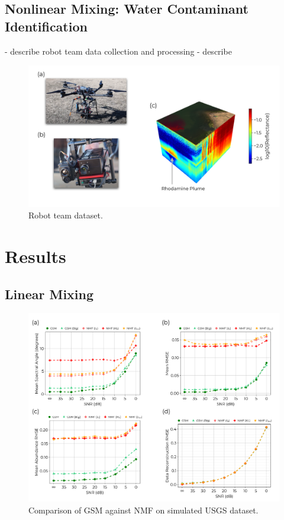 \documentclass[remotesensing,article,submit,pdftex,moreauthors]{Definitions/mdpi}
\begin{document}
\subsection{Nonlinear Mixing: Water Contaminant Identification}
- describe robot team data collection and processing
- describe 



\begin{figure}[H]
\includegraphics[width=\columnwidth]{methods/robot-team/robot-team-overview.pdf}
\caption{Robot team dataset. \label{fig:robotteam-data}}
\end{figure}  



\section{Results}\label{sec:results}
\subsection{Linear Mixing}

\begin{figure}[H]
\includegraphics[width=\columnwidth]{results/usgs/fit-comparison.pdf}
\caption{Comparison of GSM against NMF on simulated USGS dataset. \label{fig:usgs-fits}}
\end{figure}  
\end{document}
